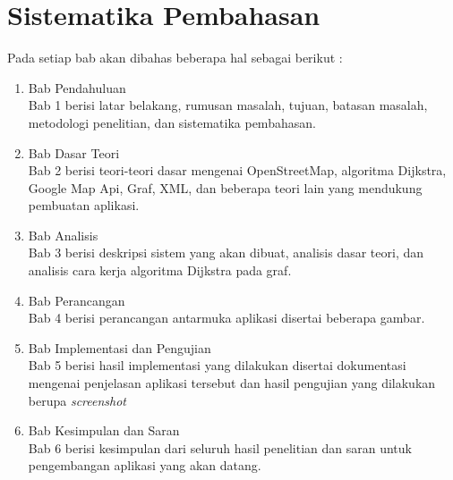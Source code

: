 \section{Sistematika Pembahasan}
Pada setiap bab akan dibahas beberapa hal sebagai berikut :
\begin{enumerate}
	\item Bab Pendahuluan\\
	Bab 1 berisi latar belakang, rumusan masalah, tujuan, batasan masalah, metodologi penelitian, dan sistematika pembahasan.
	
	\item Bab Dasar Teori\\
	Bab 2 berisi teori-teori dasar mengenai OpenStreetMap, algoritma Dijkstra,
	Google Map Api, Graf, XML, dan beberapa teori lain yang mendukung pembuatan
	aplikasi.
	
	\item Bab Analisis\\
	Bab 3 berisi deskripsi sistem yang akan dibuat, analisis dasar teori, dan
	analisis cara kerja algoritma Dijkstra pada graf.
	
	\item Bab Perancangan\\
	Bab 4 berisi perancangan antarmuka aplikasi disertai beberapa gambar.
	
	\item Bab Implementasi dan Pengujian\\
	Bab 5 berisi hasil implementasi yang dilakukan disertai dokumentasi mengenai
	penjelasan aplikasi tersebut dan hasil pengujian yang dilakukan berupa
	\textit{screenshot}
	
	\item Bab Kesimpulan dan Saran\\
	Bab 6 berisi kesimpulan dari seluruh hasil penelitian dan saran untuk
	pengembangan aplikasi yang akan datang.
\end{enumerate}
